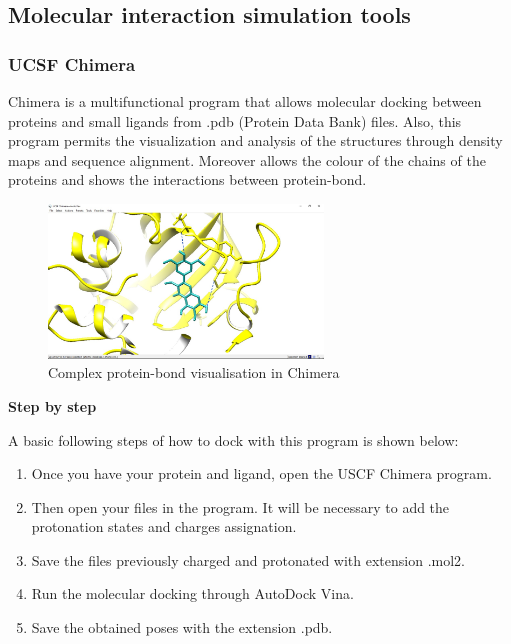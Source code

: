 \documentclass[11pt, letterpaper, english]{article}
\begin{document}
           \subsection{Molecular interaction simulation tools}
\subsubsection{UCSF Chimera}
        \par Chimera is a multifunctional program that allows molecular docking between proteins and small ligands from .pdb (Protein Data Bank) files. Also, this program permits the visualization and analysis of the structures through density maps and sequence alignment. Moreover allows the colour of the chains of the proteins and shows the interactions between protein-bond.

\begin{figure}
	    \centering
		\caption{Complex protein-bond visualisation in Chimera  \cite{Pettersen_2004}}
		\includegraphics[width=0.65\textwidth]{chimera}
	\end{figure}

        \par{\textbf{Step by step}}
        \par{A basic following steps of how to dock with this program is shown below:}
            \begin{enumerate}[1.]
            \item Once you have your protein and ligand, open the USCF Chimera program.
            \item Then open your files in the program. It will be necessary to add the protonation states and charges assignation.
            \item Save the files previously charged and protonated with extension .mol2.
            \item Run the molecular docking through AutoDock Vina.
            \item Save the obtained poses with the extension .pdb.
            \end{enumerate} 
\end{document}
